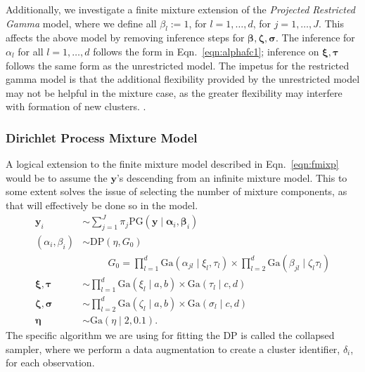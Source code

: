 Additionally, we investigate a finite mixture extension of the \emph{Projected Restricted Gamma} model,
  where we define all $\beta_l := 1$, for $l = 1,\ldots,d$, for $j = 1,\ldots,J$.  This affects the above
  model by removing inference steps for $\bm{ \beta},\bm{ \zeta},\bm{ \sigma}$.  The inference for
  $\alpha_l$ for all $l = 1,\ldots,d$ follows the form in Eqn.~\ref{eqn:alphafc1}; inference on
  $\bm{ \xi,\tau}$ follows the same form as the unrestricted model.  The impetus for the restricted
  gamma model is that the additional flexibility provided by the unrestricted model may not be helpful
  in the mixture case, as the greater flexibility may interfere with formation of new clusters.
  .

\subsubsection{Dirichlet Process Mixture Model}
A logical extension to the finite mixture model described in Eqn.~\ref{eqn:fmixp} would be to assume the
  $\bm{ y}$'s descending from an infinite mixture model.  This to some extent solves the issue of
  selecting the number of mixture components, as that will effectively be done so in the model.
  \begin{equation}
    \label{eqn:infmixp}
    \begin{aligned}
      \bm{ y}_i &\sim \sum_{j = 1}^J\pi_j\text{PG}\left(\bm{ y}\mid \bm{ \alpha}_i, \bm{ \beta}_i\right)\\
      (\alpha_i,\beta_i) &\sim \text{DP}\left(\eta, G_0\right)\\
      &~\hspace{1cm}G_0 = {\textstyle\prod}_{l = 1}^d\text{Ga}\left(\alpha_{jl}\mid\xi_{l},\tau_{l}\right)
                    \times{\textstyle\prod}_{l=2}^d\text{Ga}\left(\beta_{jl}\mid\zeta_{l}\tau_{l}\right)\\
      \bm{ \xi},\bm{ \tau} &\sim {\textstyle \prod}_{l = 1}^d \text{Ga}(\xi_l\mid a,b)\times \text{Ga}(\tau_l\mid c,d)\\
      \bm{ \zeta},\bm{\sigma} &\sim {\textstyle\prod}_{l = 2}^d\text{Ga}(\zeta_l \mid a,b)\times \text{Ga}(\sigma_l\mid c,d)\\
      \bm{ \eta} &\sim \text{Ga}(\eta \mid 2, 0.1).
    \end{aligned}
  \end{equation}
  The specific algorithm we are using for fitting the DP is called the collapsed sampler\findcite,
  where we perform a data augmentation to create a cluster identifier, $\delta_i$, for each observation.
